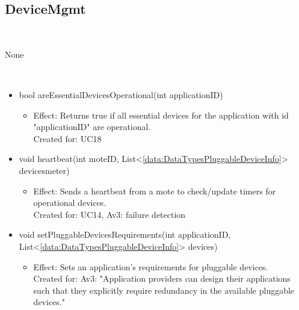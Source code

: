   \subsection{DeviceMgmt}\label{int:GatewayDeviceManagerDeviceMgmt}
    \begin{description}
      \item[Provided by:] \iconcomponent{}~
      \item[Required by:] None
      \item[Operations:] ~
    \begin{itemize}[noitemsep,nolistsep,leftmargin=-.25cm]
      \item \textsf{bool areEssentialDevicesOperational(int applicationID)}
        \begin{itemize}[noitemsep,nolistsep]
           \item Effect: Returns true if all essential devices for the application with id "applicationID" are operational. \\
Created for: UC18
        \end{itemize}
      \item \textsf{void heartbeat(int moteID, List\textless{}\ref{data:DataTypesPluggableDeviceInfo}\textgreater{} devicesmeter)}
        \begin{itemize}[noitemsep,nolistsep]
           \item Effect: Sends a heartbeat from a mote to check/update timers for operational devices. \\
Created for: UC14, Av3: failure detection
        \end{itemize}
      \item \textsf{void setPluggableDevicesRequirements(int applicationID, List\textless{}\ref{data:DataTypesPluggableDeviceInfo}\textgreater{} devices)}
        \begin{itemize}[noitemsep,nolistsep]
           \item Effect: Sets an application's requirements for pluggable devices. \\
Created for: Av3: "Application providers can design their applications such that they explicitly require redundancy in the available pluggable devices."
        \end{itemize}
    \end{itemize}
    \end{description}

